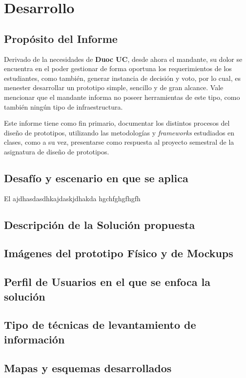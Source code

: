 \section{Desarrollo}
\subsection{Propósito del Informe}
Derivado de la necesidades de \textbf{Duoc UC},  desde ahora el mandante,  su dolor se encuentra en el poder gestionar de forma oportuna los requerimientos de los estudiantes,  como también,  generar instancia de decisión  y voto,  por lo cual,  es menester desarrollar un prototipo simple, sencillo y de gran alcance. Vale mencionar que el mandante informa no poseer herramientas de este tipo,  como también ningún tipo de infraestructura.

Este informe tiene como fin primario,  documentar los distintos procesos del diseño de prototipos, utilizando las metodologías y \textit{frameworks} estudiados en clases, como a su vez, presentarse como respuesta al proyecto semestral de la asignatura de diseño de prototipos.



\newpage
\subsection{Desafío y escenario en que se aplica}
El ajdhasdasdhkajdaskjdhakda hgchfghgfhgfh
\newpage
\subsection{Descripción de la Solución propuesta}
\newpage
\subsection{Imágenes del prototipo Físico y de Mockups}
\newpage
\subsection{Perfil de Usuarios en el que se enfoca la solución}
\newpage
\subsection{Tipo de técnicas de levantamiento de información}
\newpage
\subsection{Mapas y esquemas desarrollados}
\newpage
